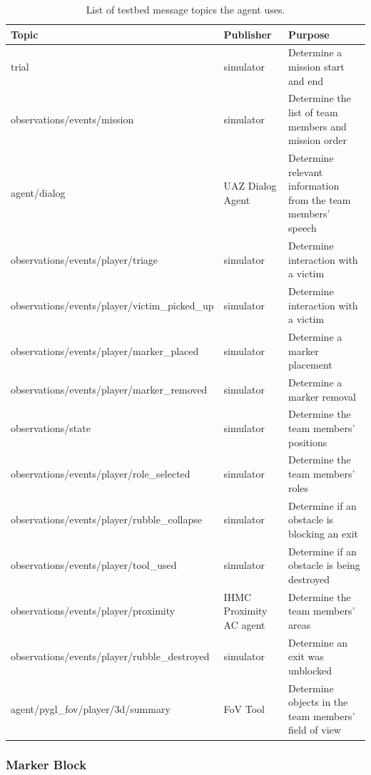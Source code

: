 %
%
\begin{table}
    \small
    \centering
    \begin{tabularx}{6in}{lp{1.2in}X}
        \toprule
        Topic & Publisher & Purpose\\
        \midrule
    	trial & simulator & Determine a mission start and end \\
    	observations/events/mission & simulator & Determine the list of team members and mission order \\
    	agent/dialog & UAZ Dialog Agent & Determine relevant information from the team members' speech \\
    	observations/events/player/triage & simulator & Determine interaction with a victim \\
    	observations/events/player/victim\_picked\_up & simulator & Determine interaction with a victim \\
    	observations/events/player/marker\_placed & simulator & Determine a marker placement \\
    	observations/events/player/marker\_removed & simulator & Determine a marker removal \\
    	observations/state & simulator & Determine the team members' positions \\
    	observations/events/player/role\_selected & simulator & Determine the team members' roles \\
    	observations/events/player/rubble\_collapse & simulator & Determine if an obstacle is blocking an exit \\
    	observations/events/player/tool\_used & simulator & Determine if an obstacle is being destroyed \\
    	observations/events/player/proximity & IHMC Proximity AC agent & Determine the team members' areas \\
    	observations/events/player/rubble\_destroyed & simulator & Determine an exit was unblocked \\
    	agent/pygl\_fov/player/3d/summary & FoV Tool & Determine objects in the team members' field of view \\
        \bottomrule
    \end{tabularx}
    \caption{%
        List of testbed message topics the agent uses.
    }
    \label{tab:intervention_variables}
\end{table}
%


\subsubsection{Marker Block}


